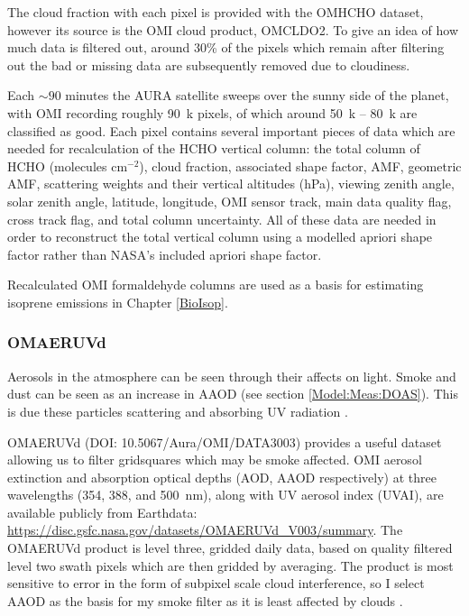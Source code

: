       The cloud fraction with each pixel is provided with the OMHCHO dataset, however its source is the OMI cloud product, OMCLDO2.
      To give an idea of how much data is filtered out, around 30\% of the pixels which remain after filtering out the bad or missing data are subsequently removed due to cloudiness.
      
      Each $\sim90$ minutes the AURA satellite sweeps over the sunny side of the planet, with OMI recording roughly 90~k pixels, of which around 50~k -- 80~k are classified as good.
      Each pixel contains several important pieces of data which are needed for recalculation of the HCHO vertical column: the total column of HCHO (molecules cm$^{-2}$), cloud fraction, associated shape factor, AMF, geometric AMF, scattering weights and their vertical altitudes (hPa), viewing zenith angle, solar zenith angle, latitude, longitude, OMI sensor track, main data quality flag, cross track flag, and total column uncertainty.
      All of these data are needed in order to reconstruct the total vertical column using a modelled apriori shape factor rather than NASA's included apriori shape factor.
      
      Recalculated OMI formaldehyde columns are used as a basis for estimating isoprene emissions in Chapter \ref{BioIsop}.
    
    \subsubsection{OMAERUVd}
      \label{Model:Datasets:OMAERUVd}
      
      Aerosols in the atmosphere can be seen through their affects on light. 
      Smoke and dust can be seen as an increase in AAOD (see section \ref{Model:Meas:DOAS}).
      This is due these particles scattering and absorbing UV radiation \parencite{Ahn2008}.
      
      
      OMAERUVd (DOI: 10.5067/Aura/OMI/DATA3003) provides a useful dataset allowing us to filter gridsquares which may be smoke affected.
      OMI aerosol extinction and absorption optical depths (AOD, AAOD respectively) at three wavelengths (354, 388, and 500~nm), along with UV aerosol index (UVAI), are available publicly from Earthdata: \url{https://disc.gsfc.nasa.gov/datasets/OMAERUVd_V003/summary}.
      The OMAERUVd product is level three, gridded daily data, based on quality filtered level two swath pixels which are then gridded by averaging.
      The product is most sensitive to error in the form of subpixel scale cloud interference, so I select AAOD as the basis for my smoke filter as it is least affected by clouds \parencite{Ahn2008}.
      
